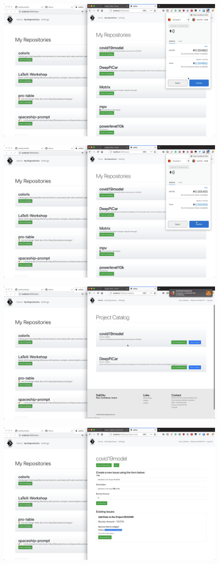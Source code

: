 \documentclass[12pt]{article}
\renewcommand{\_}{\kern-1.5pt\textunderscore\kern-1.5pt}
\begin{document}
\includegraphics[height=7cm]{graphs/23. alice_post_to_catalog_1}

\includegraphics[height=7cm]{graphs/24. alice_post_to_catalog_2}

\includegraphics[height=7cm]{graphs/25. added_project_catalog}

\includegraphics[height=7cm]{graphs/26. alice_create_issue1}
\end{document}
